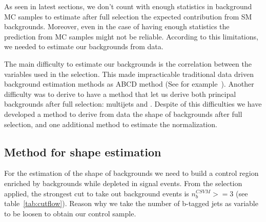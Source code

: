 As seen in latest sections, we don't count with enough statistics in background MC samples to estimate after full selection the expected contribution from SM backgrounds. Moreover, even in the case of having enough statistics the prediction from MC samples might not be reliable. According to this limitations, we needed to estimate our backgrounds from data.  

The main difficulty to estimate our backgrounds is the correlation between the variables used in the selection. This made impracticable traditional data driven background estimation methods as ABCD method (See for example~\cite{Khachatryan:2015axa}). Another difficulty was to derive to have a method that let us derive both principal backgrounds after full selection: multijets and \ttbar. Despite of this difficulties we have developed a method to derive from data the shape of backgrounds after full selection, and one additional method to estimate the normalization.

%
%
%

\subsection{Method for shape estimation}
\label{sec:bkgmet}

For the estimation of the shape of backgrounds we need to build a control region enriched by backgrounds while depleted in signal events. From the selection applied, the strongest cut to take out background events is $n_{b}^{CSVM}>=3$ (see table~\ref{tab:cutflow}). Reason why we take the number of b-tagged jets as variable to be loosen to obtain our control sample. 

